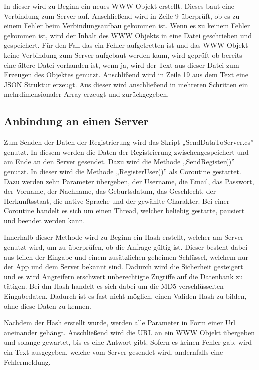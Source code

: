 	In dieser wird zu Beginn ein neues WWW Objekt erstellt. Dieses baut eine Verbindung zum Server auf. Anschließend wird in Zeile 9 überprüft, ob es zu einem Fehler beim Verbindungsaufbau gekommen ist. Wenn es zu keinem Fehler gekommen ist, wird der Inhalt des WWW Objekts in eine Datei geschrieben und gespeichert. Für den Fall das ein Fehler aufgetretten ist und das WWW Objekt keine Verbindung zum Server aufgebaut werden kann, wird geprüft ob bereits eine ältere Datei vorhanden ist, wenn ja, wird der Text aus dieser Datei zum Erzeugen des Objektes genutzt. Anschlißend wird in Zeile 19 aus dem Text eine \ac{JSON} Struktur erzeugt. Aus dieser wird anschließend in mehreren Schritten ein mehrdimensionaler Array erzeugt und zurückgegeben.

\subsection{Anbindung an einen Server}
Zum Senden der Daten der Registrierung wird das Skript „SendDataToServer.cs” genutzt. In diesem werden die Daten der Registrierung zwischengespeichert und am Ende an den Server gesendet. Dazu wird die Methode „SendRegister()” genutzt. In dieser wird die Methode „RegisterUser()” als Coroutine gestartet. Dazu werden zehn Parameter übergeben, der Username, die Email, das Passwort, der Vorname, der Nachname, das Geburtsdatum, das Geschlecht, der Herkunftsstaat, die native Sprache und der gewählte Charakter. Bei einer Coroutine handelt es sich um einen Thread, welcher beliebig gestarte, pausiert und beendet werden kann.
	
Innerhalb dieser Methode wird zu Beginn ein Hash erstellt, welcher am Server genutzt wird, um zu überprüfen, ob die Anfrage gültig ist. Dieser besteht dabei aus teilen der Eingabe und einem zusätzlichen geheimen Schlüssel, welchem nur der App und dem Server bekannt sind. Dadurch wird die Sicherheit gesteigert und es wird Angreifern erschwert unberechtigte Zugriffe auf die Datenbank zu tätigen. Bei dm Hash handelt es sich dabei um die MD5 verschlüsselten Eingabedaten. Dadurch ist es fast nicht möglich, einen Validen Hash zu bilden, ohne diese Daten zu kennen.
	
Nachdem der Hash erstellt wurde, werden alle Parameter in Form einer Url aneinander gehängt. Anschließend wird die URL an ein WWW Objekt übergeben und solange gewartet, bis es eine Antwort gibt. Sofern es keinen Fehler gab, wird ein Text ausgegeben, welche vom Server gesendet wird, andernfalls eine Fehlermeldung.

